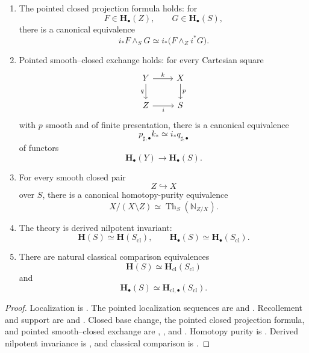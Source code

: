 \begin{theorem}
\begin{enumerate}[label=(\roman*)]
    \item The pointed closed projection formula holds:
    for
    \[
        F\in\mathbf H_\bullet(Z),
        \qquad
        G\in\mathbf H_\bullet(S),
    \]
    there is a canonical equivalence
    \[
        i_*F\wedge_SG
        \simeq
        i_*
        \bigl(
            F\wedge_Zi^*G
        \bigr).
    \]

    \item Pointed smooth--closed exchange holds:
    for every Cartesian square
    \[
    \begin{tikzcd}
        Y \arrow[r, "k"] \arrow[d, "q"']
        &
        X \arrow[d, "p"]
        \\
        Z \arrow[r, "i"']
        &
        S
    \end{tikzcd}
    \]
    with \(p\) smooth and of finite presentation, there is a canonical
    equivalence
    \[
        p_{\sharp,\bullet}k_*
        \simeq
        i_*q_{\sharp,\bullet}
    \]
    of functors
    \[
        \mathbf H_\bullet(Y)
        \longrightarrow
        \mathbf H_\bullet(S).
    \]

    \item For every smooth closed pair
    \[
        Z
        \hookrightarrow
        X
    \]
    over \(S\), there is a canonical homotopy-purity equivalence
    \[
        X/(X\setminus Z)
        \simeq
        \operatorname{Th}_S(\mathbb N_{Z/X}).
    \]

    \item The theory is derived nilpotent invariant:
    \[
        \mathbf H(S)
        \simeq
        \mathbf H(S_{\mathrm{cl}}),
        \qquad
        \mathbf H_\bullet(S)
        \simeq
        \mathbf H_\bullet(S_{\mathrm{cl}}).
    \]

    \item There are natural classical comparison equivalences
    \[
        \mathbf H(S)
        \simeq
        \mathbf H_{\mathrm{cl}}(S_{\mathrm{cl}})
    \]
    and
    \[
        \mathbf H_\bullet(S)
        \simeq
        \mathbf H_{\mathrm{cl},\bullet}(S_{\mathrm{cl}}).
    \]
\end{enumerate}
\end{theorem}

\begin{proof}
Localization is
.
The pointed localization sequences are
and
.
Recollement and support are
and
.
Closed base change, the pointed closed projection formula, and pointed
smooth--closed exchange are
,
, and
.
Homotopy purity is
.
Derived nilpotent invariance is
,
and classical comparison is
.
\end{proof}

